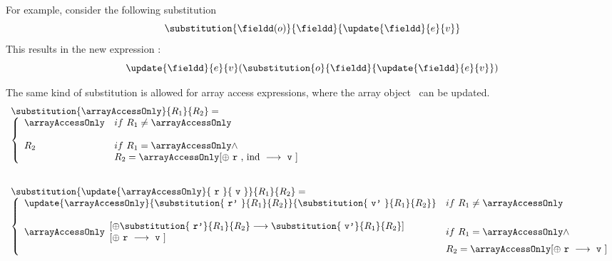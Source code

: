 For example, consider the following substitution  
$$ \substitution{\fieldd(o)}{\fieldd}{\update{\fieldd}{e }{v }} $$
This results in the new expression : 
$$\update{\fieldd}{ e}{ v} (\substitution{o}{ \fieldd}{ \update{ \fieldd}{ e}{ v }}) $$


The same kind of substitution is allowed for array access expressions, where the array object \arrayAccessOnly \  can be updated. 
$$  
\begin{array}{l}
\substitution{\arrayAccessOnly}{R_1}{R_2} = \\
\left\{\begin{array}{ll}
\arrayAccessOnly  & if \ R_1 \neq \arrayAccessOnly \\ 
&\\ 

R_2  &  if \  R_1 = \arrayAccessOnly \wedge \\
               &  R_2 = \arrayAccessOnly  [ \oplus \mbox{ \rm \texttt{r} , ind } \longrightarrow \mbox{  \rm \texttt{v} } ]
\end{array}
\right. \\
\\
\\
\substitution {\update{\arrayAccessOnly}{ \mbox{ \rm \texttt{r} }}{ \mbox{  \rm \texttt{v} } }} {R_1}{R_2} = \\
\left\{\begin{array}{ll}
\update{\arrayAccessOnly}{ \substitution{\mbox{ \rm \texttt{r'} }}{ R_1 }{ R_2}}{ \substitution{\mbox{ \rm \texttt{v'} }}{ R_1 }{ R_2}  } 

 & if \ R_1 \neq \arrayAccessOnly \\
& \\ 
\arrayAccessOnly  \begin{array}{l}
                        \lbrack \oplus \substitution{ \mbox{ \rm \texttt{r'}}}{R_1}{R_2} \longrightarrow  \substitution{ \mbox{ \rm \texttt{v'}} }{R_1}{R_2} \rbrack \\
	                \lbrack \oplus \mbox{ \rm \texttt{r} } \longrightarrow \mbox{  \rm \texttt{v} } \rbrack
	     \end{array}
&  

                if \   R_1 = \arrayAccessOnly \wedge \\
               &  R_2 = \arrayAccessOnly[ \oplus \mbox{ \rm \texttt{r} } \longrightarrow \mbox{  \rm \texttt{v} } ]

\end{array}
\right. 
\end{array}
$$ 

